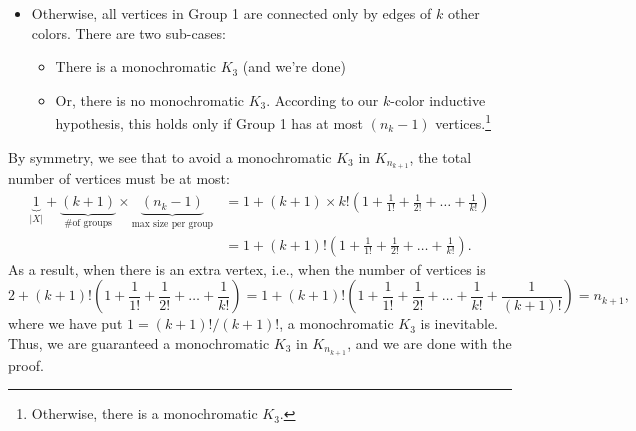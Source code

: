 \documentclass[11pt]{article}
\newcommand{\f}[2]{\frac{#1}{#2}}
\begin{document}
\begin{enumerate}[(a)]
\begin{itemize}
		\item Otherwise, all vertices in Group 1 are connected only by edges of $k$ other colors. There are two sub-cases:
		\begin{itemize}
			\item There is a monochromatic $K_3$ (and we're done)
			\item Or, there is no monochromatic $K_3$. According to our $k$-color inductive hypothesis, this holds only if Group 1 has at most $(n_k-1)$ vertices.\footnote{Otherwise, there is a monochromatic $K_3$.}
		\end{itemize}
	\end{itemize}
	By symmetry, we see that to avoid a monochromatic $K_3$ in $K_{n_{k+1}}$, the total number of vertices must be at most:
	\begin{align*}
	\underbrace{1}_{|X|}+ \underbrace{(k+1)}_{\text{\# of groups}} \times \underbrace{(n_k-1)}_{\text{max size per group}} 
	&= 1 + (k+1) \times  k! \left(1 + \f{1}{1!} + \f{1}{2!} + \dots + \f{1}{k!} \right)\\
	&= 1 + (k+1)!\left(1 + \f{1}{1!} + \f{1}{2!} + \dots + \f{1}{k!} \right).
	\end{align*}
	As a result, when there is an extra vertex, i.e., when the number of vertices is 
	\begin{equation*}
	2 + (k+1)!\left(1 + \f{1}{1!} + \f{1}{2!} + \dots + \f{1}{k!} \right) = 1 + (k+1)!\left(1 + \f{1}{1!} + \f{1}{2!} + \dots + \f{1}{k!} + \f{1}{(k+1)!} \right) = n_{k+1},
	\end{equation*}
	where we have put $1 = (k+1)!/(k+1)!$, a monochromatic $K_3$ is inevitable. Thus, we are guaranteed a monochromatic $K_3$ in $K_{n_{k+1}}$, and we are done with the proof. 

	
\end{enumerate}
\end{document}
